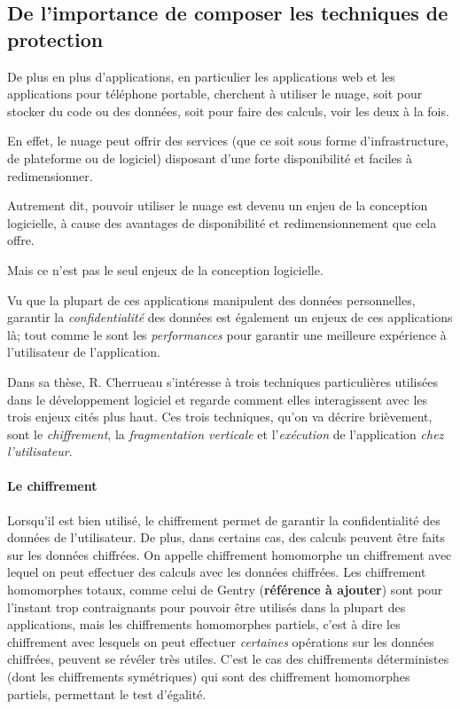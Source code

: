 \subsection{De l'importance de composer les techniques de protection}

De plus en plus d'applications, en particulier
les applications web et les applications pour téléphone portable,
cherchent à utiliser le nuage, soit pour stocker du code ou des données, 
soit pour faire des calculs,
voir les deux à la fois.

En effet, le nuage peut offrir des services (que ce soit sous forme d'infrastructure,
de plateforme ou de logiciel) disposant d'une forte disponibilité et faciles à redimensionner.

Autrement dit, pouvoir utiliser le nuage est devenu un enjeu de la conception logicielle,
à cause des avantages de disponibilité et redimensionnement que cela offre.

Mais ce n'est pas le seul enjeux de la conception logicielle.

Vu que la plupart de ces applications manipulent des données personnelles, 
garantir la \emph{confidentialité} des données est également un enjeux de 
ces applications là; tout comme le sont les \emph{performances} pour garantir
une meilleure expérience à l'utilisateur de l'application.

Dans sa thèse, R. Cherrueau s'intéresse à trois techniques particulières
utilisées dans le développement logiciel et regarde comment elles interagissent
avec les trois enjeux cités plus haut.
Ces trois techniques, qu'on va décrire brièvement, sont
	le \emph{chiffrement},
	la \emph{fragmentation verticale} et
	l'\emph{exécution} de l'application \emph{chez l'utilisateur}.

\paragraph{Le chiffrement}
Lorsqu'il est bien utilisé, le chiffrement permet de garantir la confidentialité
des données de l'utilisateur.
De plus, dans certains cas, des calculs peuvent être faits sur les données chiffrées.
On appelle chiffrement homomorphe un chiffrement avec lequel on peut effectuer des calculs
avec les données chiffrées. Les chiffrement homomorphes totaux, comme celui de
Gentry (\textbf{référence à ajouter}) sont pour l'instant trop contraignants pour pouvoir être utilisés
dans la plupart des applications, mais les chiffrements homomorphes partiels,
c'est à dire les chiffrement avec lesquels on peut effectuer \emph{certaines}
opérations sur les données chiffrées, peuvent se révéler très utiles.
C'est le cas des chiffrements déterministes (dont les chiffrements symétriques)
qui sont des chiffrement homomorphes partiels, permettant le test d'égalité.

